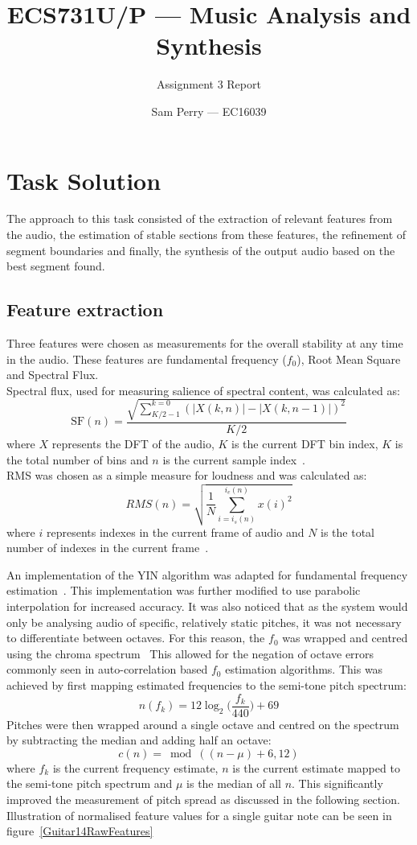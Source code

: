 \documentclass[titlepage]{scrartcl}
\begin{document}
\title{ECS731U/P --- Music Analysis and Synthesis}
\subtitle{\LARGE{Assignment 3 Report}}
\author{Sam Perry --- EC16039}

\maketitle

\section{Task Solution}
The approach to this task consisted of the extraction of relevant features from
the audio, the estimation of stable sections from these features, the
refinement of segment boundaries and finally, the synthesis of the output audio
based on the best segment found.

\subsection{Feature extraction}
Three features were chosen as measurements for the overall stability at any
time in the audio. These features are fundamental frequency ($f_0$), Root Mean
Square and Spectral Flux.\\
Spectral flux, used for measuring salience of spectral content, was calculated as:
$$
\text{SF}(n) =
\frac{\sqrt{\sum_{K/2-1}^{k=0}(|X(k,n)|-|X(k,n-1)|)^2}}{K/2}
$$
where $X$ represents the DFT of the audio, $K$ is the current DFT bin index, $K$ is
the total number of bins and $n$ is the current sample
index~\parencite{Lerch2012}.\\
RMS was chosen as a simple measure for loudness and was calculated as:
$$RMS(n) = \sqrt{\frac{1}{N}\sum_{i=i_s(n)}^{i_e(n)}{x(i)^2}}$$
where $i$ represents indexes in the current frame of audio and $N$ is the total
number of indexes in the current frame~\parencite{Lerch2012}.

An implementation of the YIN algorithm was adapted for fundamental frequency
estimation~\parencite[p352-353]{Zolzer2011}. This implementation was further
modified to use parabolic interpolation for increased accuracy.
It was also noticed that as the system would only be analysing audio of
specific, relatively static pitches, it was not necessary to differentiate
between octaves. For this reason, the $f_0$ was wrapped and centred
using the chroma spectrum~\parencite[p.4]{Peeters2006} This allowed for the negation of octave errors
commonly seen in auto-correlation based $f_0$ estimation algorithms. This was
achieved by first mapping estimated frequencies to the semi-tone pitch
spectrum:
$$n(f_k) = 12\log_2\Big(\frac{f_k}{440}\Big)+69$$
Pitches were then wrapped around a single octave and centred on the spectrum by
subtracting the median and adding half an octave:
$$c(n) = \bmod((n-\mu)+6, 12)$$
where $f_k$ is the current frequency estimate, $n$ is the current estimate
mapped to the semi-tone pitch spectrum and $\mu$ is the median of all $n$.
This significantly improved the measurement of pitch spread  as discussed in
the following section.
Illustration of normalised feature values for a single guitar note can be seen
in figure~\ref{Guitar14RawFeatures}
\end{document}
